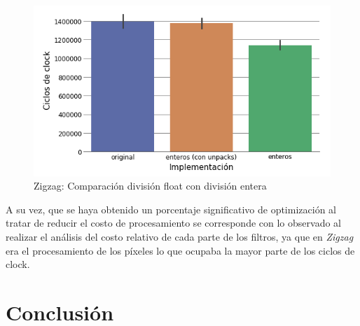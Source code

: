 \documentclass[a4paper]{article}
\begin{document}
\begin{figure}[!htb]
  \begin{center}
	\includegraphics[scale=0.6]{img/exp4diventera.png}
	\caption{Zigzag: Comparación división float con división entera}
  \end{center}
\end{figure}

A su vez, que se haya obtenido un porcentaje significativo de optimización al tratar de reducir el costo de procesamiento se corresponde con lo observado al realizar el análisis del costo relativo de cada parte de los filtros, ya que en \textit{Zigzag} era el procesamiento de los píxeles lo que ocupaba la mayor parte de los ciclos de clock.

\newpage
\section{Conclusión}
\end{document}
